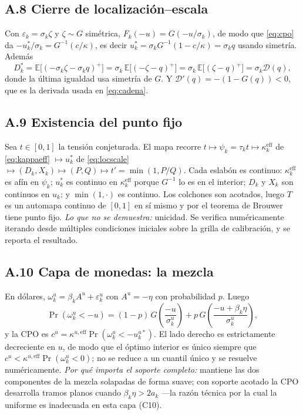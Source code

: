 \documentclass[11pt]{article}
\newcommand{\E}{\mathbb{E}}
\newcommand{\keff}{\kappa^{\mathrm{eff}}}
\theoremstyle{definition}
\begin{document}
\subsection*{A.8 Cierre de localizaci\'on--escala}
Con $\varepsilon_k=\sigma_k\zeta$ y $\zeta\sim G$ sim\'etrica,
$F_k(-u)=G(-u/\sigma_k)$, de modo que \eqref{eq:cpo} da
$-u^*_k/\sigma_k=G^{-1}(c/\kappa)$, es decir
$u^*_k=\sigma_k G^{-1}(1-c/\kappa)=\sigma_k q$ usando simetr\'ia. Adem\'as
\[
D^*_k=\E\big[(-\sigma_k\zeta-\sigma_k q)^+\big]
=\sigma_k\,\E\big[(-\zeta-q)^+\big]
=\sigma_k\,\E\big[(\zeta-q)^+\big]=\sigma_k\mathcal{D}(q),
\]
donde la \'ultima igualdad usa simetr\'ia de $G$. Y
$\mathcal{D}'(q)=-(1-G(q))<0$, que es la derivada usada en
\eqref{eq:cadena}.

\subsection*{A.9 Existencia del punto fijo}
Sea $t\in[0,1]$ la tensi\'on conjeturada. El mapa recorre
$t\mapsto\psi_k=\tau_k t\mapsto\keff_k$ de \eqref{eq:kappaeff}
$\mapsto u^*_k$ de \eqref{eq:locscale} $\mapsto(D_k,X_k)\mapsto(P,Q)\mapsto
t'=\min(1,P/Q)$. Cada eslab\'on es continuo: $\keff_k$ es af\'in en $\psi_k$;
$u^*_k$ es continuo en $\keff_k$ porque $G^{-1}$ lo es en el interior;
$D_k$ y $X_k$ son continuos en $u_k$; y $\min(1,\cdot)$ es continuo. Los
colchones son acotados, luego $T$ es un automapa continuo de $[0,1]$ en s\'i
mismo y por el teorema de Brouwer tiene punto fijo. \emph{Lo que no se
demuestra:} unicidad. Se verifica num\'ericamente iterando desde m\'ultiples
condiciones iniciales sobre la grilla de calibraci\'on, y se reporta el resultado.

\subsection*{A.10 Capa de monedas: la mezcla}
En d\'olares, $\omega^u_k=\beta_k A^u+\varepsilon^u_k$ con $A^u=-\eta$ con
probabilidad $p$. Luego
\[
\Pr(\omega^u_k<-u)=(1-p)\,G\!\left(\frac{-u}{\sigma^u_k}\right)
+p\,G\!\left(\frac{-u+\beta_k\eta}{\sigma^u_k}\right),
\]
y la CPO es $c^u=\kappa^{u,\mathrm{eff}}\Pr(\omega^u_k<-u^{u*}_k)$. El lado
derecho es estrictamente decreciente en $u$, de modo que el \'optimo interior es
\'unico siempre que $c^u<\kappa^{u,\mathrm{eff}}\Pr(\omega^u_k<0)$; no se reduce a
un cuantil \'unico y se resuelve num\'ericamente. \emph{Por qu\'e importa el soporte
completo:} mantiene las dos componentes de la mezcla solapadas de forma suave;
con soporte acotado la CPO desarrolla tramos planos cuando $\beta_k\eta>2a_k$
---la raz\'on t\'ecnica por la cual la uniforme es inadecuada en esta capa (C10).
\end{document}
